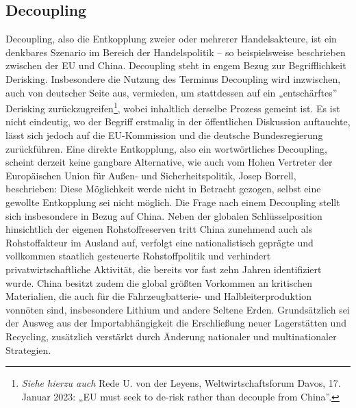 \documentclass[12pt,a4paper,oneside]{book} %
\begin{document}
	\subsection{Decoupling}
	Decoupling, also die Entkopplung zweier oder mehrerer Handelsakteure, ist ein denkbares Szenario im Bereich der Handelspolitik – so beispielsweise beschrieben zwischen der EU und China.\autocite{fuest_geopolitische_2022} Decoupling steht in engem Bezug zur Begrifflichkeit Derisking. Insbesondere die Nutzung des Terminus Decoupling wird inzwischen, auch von deutscher Seite aus, vermieden, um stattdessen auf ein „entschärftes” Derisking zurückzugreifen\footnote{\textit{Siehe hierzu auch} Rede U. von der Leyens, Weltwirtschaftsforum Davos, 17. Januar 2023: „EU must seek to de-risk rather than decouple from China”.}, wobei inhaltlich derselbe Prozess gemeint ist. Es ist nicht eindeutig, wo der Begriff erstmalig in der öffentlichen Diskussion auftauchte, lässt sich jedoch auf die EU-Kommission und die deutsche Bundesregierung zurückführen.\autocite{kormbaki_wettstreit_2023} Eine direkte Entkopplung, also ein wortwörtliches Decoupling, scheint derzeit keine gangbare Alternative, wie auch vom Hohen Vertreter der Europäischen Union für Außen- und Sicherheitspolitik, Josep Borrell, beschrieben: Diese Möglichkeit werde nicht in Betracht gezogen, selbst eine gewollte Entkopplung sei nicht möglich.\autocite{europaischer_auswartiger_dienst_foreign_2023} Die Frage nach einem Decoupling stellt sich insbesondere in Bezug auf China. Neben der globalen Schlüsselposition hinsichtlich der eigenen Rohstoffreserven tritt China zunehmend auch als Rohstoffakteur im Ausland auf, verfolgt eine nationalistisch geprägte und vollkommen staatlich gesteuerte Rohstoffpolitik und verhindert privatwirtschaftliche Aktivität, die bereits vor fast zehn Jahren identifiziert wurde.\autocite{sausmikat_chinas_2015} China besitzt zudem die global größten Vorkommen an kritischen Materialien, die auch für die Fahrzeugbatterie- und Halbleiterproduktion vonnöten sind, insbesondere Lithium und andere Seltene Erden. Grundsätzlich sei der Ausweg aus der Importabhängigkeit die Erschließung neuer Lagerstätten und Recycling, zusätzlich verstärkt durch Änderung nationaler und multinationaler Strategien.\autocite{wissenschaftliche_dienste_des_deutschen_bundestages_seltene_2022}

	
\end{document}
